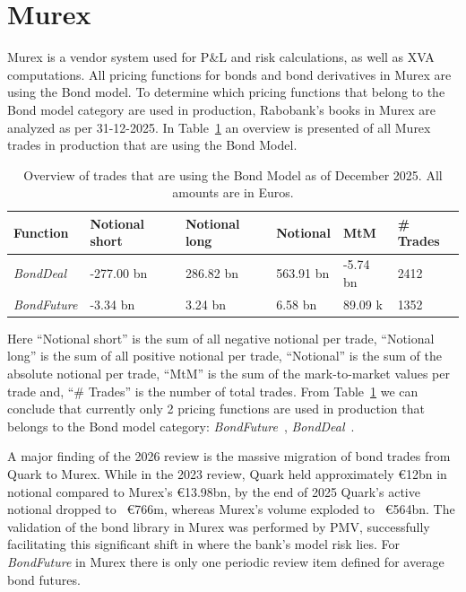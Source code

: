 \documentclass[reviewdoc]{pmv_report}  %
\begin{document}
\section{Murex}\label{sec:Murex}
Murex is a vendor system used for P\&L and risk calculations, as well as XVA computations.
All pricing functions for bonds and bond derivatives in Murex are using the Bond model.
To determine which pricing functions that belong to the Bond model category are used in production, Rabobank's books in Murex are analyzed as per 31-12-2025.
In Table~\ref{table:MurexBondTradesProduction} an overview is presented of all Murex trades in production that are using the Bond Model.
\begin{table}[htb!]
\footnotesize
\centering
\begin{tabular}{l|l|l|l|l|l}
  \toprule[0.05cm]
  \textbf{Function} & {\textbf{Notional short}} & {\textbf{Notional long}} & {\textbf{Notional}} & {\textbf{MtM}} & \textbf{\# Trades} \\
  \hline\hline
  \textit{BondDeal}       & -277.00 bn &  286.82 bn & 563.91 bn & -5.74 bn & 2412  \\ \hline
  \textit{BondFuture}     & -3.34 bn &  3.24 bn & 6.58 bn & 89.09 k & 1352  \\ \hline
  \bottomrule[0.05cm]
\end{tabular}
\caption{Overview of trades that are using the Bond Model as of December 2025. All amounts are in Euros.}
\label{table:MurexBondTradesProduction}
\end{table}

Here ``Notional short'' is the sum of all negative notional per trade, ``Notional long'' is the sum of all positive notional per trade, ``Notional'' is the sum of the absolute notional per trade, ``MtM'' is the sum of the mark-to-market values per trade and, ``\# Trades'' is the number of total trades. From Table~\ref{table:MurexBondTradesProduction} we can conclude that currently only 2 pricing functions are used in production that belongs to the Bond model category: \textit{BondFuture}~\cite{Mx.BondFutures}, \textit{BondDeal}~\cite{Mx.BondProducts}.


A major finding of the 2026 review is the massive migration of bond trades from Quark to Murex. While in the 2023 review, Quark held approximately €12bn in notional compared to Murex's €13.98bn, by the end of 2025 Quark's active notional dropped to ~€766m, whereas Murex's volume exploded to ~€564bn. The validation of the bond library in Murex was performed by PMV, successfully facilitating this significant shift in where the bank's model risk lies.
For \textit{BondFuture} in Murex there is only one periodic review item defined for average bond futures.
\end{document}

